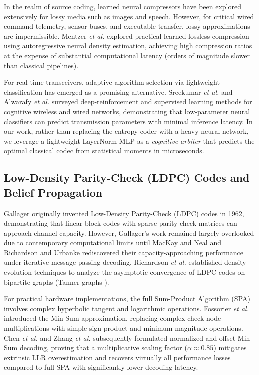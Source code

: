 \documentclass[conference]{IEEEtran}
\begin{document}
In the realm of source coding, learned neural compressors have been explored extensively for lossy media such as images \cite{balle2018} and speech. However, for critical wired command telemetry, sensor buses, and executable transfer, lossy approximations are impermissible. Mentzer \textit{et al.} \cite{mentzer2019} explored practical learned lossless compression using autoregressive neural density estimation, achieving high compression ratios at the expense of substantial computational latency (orders of magnitude slower than classical pipelines). 

For real-time transceivers, adaptive algorithm selection via lightweight classification has emerged as a promising alternative. Sreekumar \textit{et al.} \cite{sreekumar2020} and Alwarafy \textit{et al.} \cite{alwarafy2022} surveyed deep-reinforcement and supervised learning methods for cognitive wireless and wired networks, demonstrating that low-parameter neural classifiers can predict transmission parameters with minimal inference latency. In our work, rather than replacing the entropy coder with a heavy neural network, we leverage a lightweight LayerNorm MLP as a \textit{cognitive arbiter} that predicts the optimal classical codec from statistical moments in microseconds.

\subsection{Low-Density Parity-Check (LDPC) Codes and Belief Propagation}
Gallager \cite{gallager1962} originally invented Low-Density Parity-Check (LDPC) codes in 1962, demonstrating that linear block codes with sparse parity-check matrices can approach channel capacity. However, Gallager's work remained largely overlooked due to contemporary computational limits until MacKay and Neal \cite{mackay1996} and Richardson and Urbanke \cite{richardson2001} rediscovered their capacity-approaching performance under iterative message-passing decoding. Richardson \textit{et al.} \cite{richardson2001design} established density evolution techniques to analyze the asymptotic convergence of LDPC codes on bipartite graphs (Tanner graphs \cite{tanner1981}).

For practical hardware implementations, the full Sum-Product Algorithm (SPA) involves complex hyperbolic tangent and logarithmic operations. Fossorier \textit{et al.} \cite{fossorier1999} introduced the Min-Sum approximation, replacing complex check-node multiplications with simple sign-product and minimum-magnitude operations. Chen \textit{et al.} \cite{chen2005} and Zhang \textit{et al.} \cite{zhang2010} subsequently formulated normalized and offset Min-Sum decoding, proving that a multiplicative scaling factor ($\alpha \approx 0.85$) mitigates extrinsic LLR overestimation and recovers virtually all performance losses compared to full SPA with significantly lower decoding latency.
\end{document}
